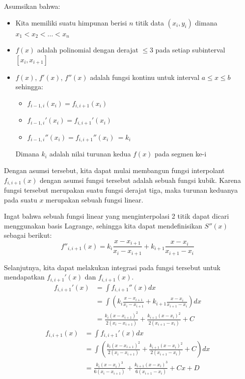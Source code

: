 \documentclass[journal,12pt,onecolumn,a4paper]{IEEEtran}
\begin{document}
Asumsikan bahwa:
\begin{itemize}
	\item Kita memiliki suatu himpunan berisi \(n\) titik data \((x_i, y_i)\) dimana \(x_1 < x_2 < \dots < x_n\)
	\item \(f(x)\) adalah polinomial dengan derajat \(\leq 3\) pada setiap subinterval \([x_i, x_{i + 1}]\)
	\item \(f(x)\), \(f'(x)\), \(f''(x)\) adalah fungsi kontinu untuk interval \(a \leq x \leq b\) sehingga:
	      \begin{itemize}
		      \item \(f_{i-1,i}(x_i) = f_{i, i+1}(x_i)\)
		      \item \(f_{i-1,i}'(x_i) = f_{i, i+1}'(x_i)\)
		      \item \(f_{i-1,i}''(x_i) = f_{i, i+1}''(x_i)\ = k_i\)
	      \end{itemize}
	      Dimana \(k_i\) adalah nilai turunan kedua \(f(x)\) pada segmen ke-i
\end{itemize}

Dengan asumsi tersebut, kita dapat mulai membangun fungsi interpolant \(f_{i, i+1}(x)\) dengan asumsi fungsi tersebut adalah sebuah fungsi kubik. Karena fungsi tersebut merupakan suatu fungsi derajat tiga, maka turunan keduanya pada suatu \(x\) merupakan sebuah fungsi linear.

Ingat bahwa sebuah fungsi linear yang menginterpolasi 2 titik dapat dicari menggunakan basis Lagrange, sehingga kita dapat mendefinisikan \(S''(x)\) sebagai berikut:
\begin{equation*}
	f''_{i, i+1}(x) = k_i\frac{x-x_{i + 1}}{x_i - x_{i + 1}} + k_{i+1}\frac{x - x_i}{x_{i + 1} - x_i}
\end{equation*}

Selanjutnya, kita dapat melakukan integrasi pada fungsi tersebut untuk mendapatkan \(f_{i, i+1}'(x)\) dan \(f_{i, i+1}(x)\).
\begin{equation*}
	\begin{split}
		f_{i, i+1}'(x) & = \int f_{i, i+1}''(x) dx\\
		& = \int (k_i\frac{x-x_{i + 1}}{x_i - x_{i + 1}} + k_{i+1}\frac{x - x_i}{x_{i + 1} - x_i})dx\\
		& = \frac{k_i(x-x_{i+1})^2}{2(x_i-x_{i+1})} + \frac{k_{i+1}(x-x_{i})^2}{2(x_{i+1}-x_{i})} + C
	\end{split}
\end{equation*}
\begin{equation*}
	\begin{split}
		f_{i, i+1}(x) & = \int f_{i, i+1}'(x) dx\\
		& = \int (\frac{k_i(x-x_{i+1})^2}{2(x_i-x_{i+1})} + \frac{k_{i+1}(x-x_{i})^2}{2(x_{i+1}-x_{i})} + C)dx\\
		& = \frac{k_i(x-x_i)^3}{6(x_i - x_{i+1})} + \frac{k_{i+1}(x - x_i)^3}{6(x_{i+1} - x_i)} + Cx + D
	\end{split}
\end{equation*}
\end{document}
